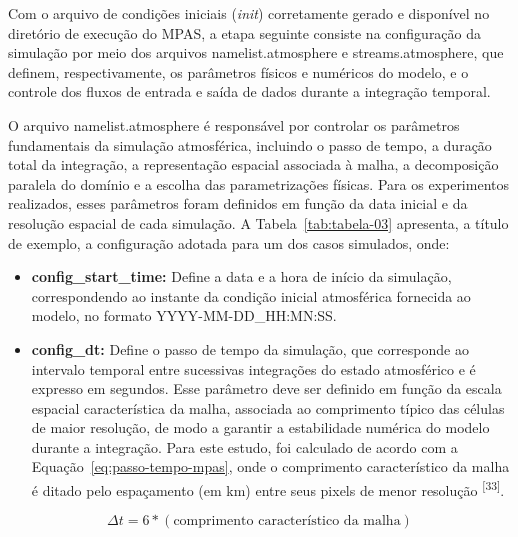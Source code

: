 \documentclass[12pt,a4paper,oneside]{book}
\begin{document}
Com o arquivo de condições iniciais (\emph{init}) corretamente gerado e disponível no diretório de execução do MPAS, a etapa seguinte consiste na configuração da simulação por meio dos arquivos namelist.atmosphere e streams.atmosphere, que definem, respectivamente, os parâmetros físicos e numéricos do modelo, e o controle dos fluxos de entrada e saída de dados durante a integração temporal.

O arquivo namelist.atmosphere é responsável por controlar os parâmetros fundamentais da simulação atmosférica, incluindo o passo de tempo, a duração total da integração, a representação espacial associada à malha, a decomposição paralela do domínio e a escolha das parametrizações físicas. Para os experimentos realizados, esses parâmetros foram definidos em função da data inicial e da resolução espacial de cada simulação. A Tabela~\ref*{tab:tabela-03} apresenta, a título de exemplo, a configuração adotada para um dos casos simulados, onde:

\begin{itemize}
\item
  \textbf{config\_start\_time:} Define a data e a hora de início da simulação, correspondendo ao instante da condição inicial atmosférica fornecida ao modelo, no formato YYYY-MM-DD\_HH:MN:SS.
\item
  \textbf{config\_dt:} Define o passo de tempo da simulação, que corresponde ao intervalo temporal entre sucessivas integrações do estado atmosférico e é expresso em segundos. Esse parâmetro deve ser definido em função da escala espacial característica da malha, associada ao comprimento típico das células de maior resolução, de modo a garantir a estabilidade numérica do modelo durante a integração. Para este estudo, foi calculado de acordo com a Equação~\ref{eq:passo-tempo-mpas}, onde o comprimento característico da malha é ditado pelo espaçamento (em km) entre seus pixels de menor resolução \textsuperscript{{[}33{]}}.
\end{itemize}

\begin{equation}
\label{eq:passo-tempo-mpas}
\Delta t = 6 \ast \left(\text{comprimento característico da malha}\right)
\end{equation}
\end{document}

